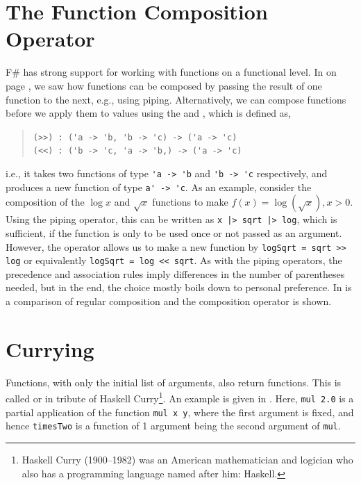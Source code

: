 \documentclass[fsharpNotes.tex]{subfiles}
\begin{document}
\section{The Function Composition Operator}
F\# has strong support for working with functions on a functional level. In  on page \pageref{page:piping}, we saw how functions can be composed by passing the result of one function to the next, e.g., using piping. Alternatively, we can compose functions before we apply them to values using the \idx[{>>}@\lstinline{>>}]{\lexeme{>>}} and \idx[{<<}@\lstinline{<<}]{\lexeme{<<}} %
, which is defined as,
\begin{quote}
  \lstinline{(>>) : ('a -> 'b, 'b -> 'c) -> ('a -> 'c)}\\
  \lstinline{(<<) : ('b -> 'c, 'a -> 'b,) -> ('a -> 'c)} %
\end{quote}
i.e., it takes two functions of type \lstinline{'a -> 'b} and \lstinline{'b -> 'c} respectively, and produces a new function of type \lstinline{a' -> 'c}. As an example, consider the composition of the $\log x$ and $\sqrt{x}$ functions to make $f(x) = \log\left(\sqrt{x}\right), x>0$. Using the piping operator, this can be written as \lstinline{x |> sqrt |> log}, which is sufficient, if the function is only to be used once or not passed as an argument. However, the \lexeme{>>} operator allows us to make a new function by \lstinline{logSqrt = sqrt >> log} or equivalently \lstinline{logSqrt = log << sqrt}. %
As with the piping operators, the precedence and association rules imply differences in the number of parentheses needed, but in the end, the choice mostly boils down to personal preference. In  is a comparison of regular composition and the composition operator is shown. 
%

\section{Currying}
Functions, with only the initial list of arguments, also return functions. This is called  or  in tribute of Haskell Curry\footnote{Haskell Curry (1900--1982) was an American mathematician and logician who also has a programming language named after him: Haskell.}. 
An example is given in .
%
%
Here, \lstinline{mul 2.0} is a partial application of the function \lstinline{mul x y}, where the first argument is fixed, and hence \lstinline{timesTwo} is a function of 1 argument being the second argument of \lstinline{mul}.
\end{document}
